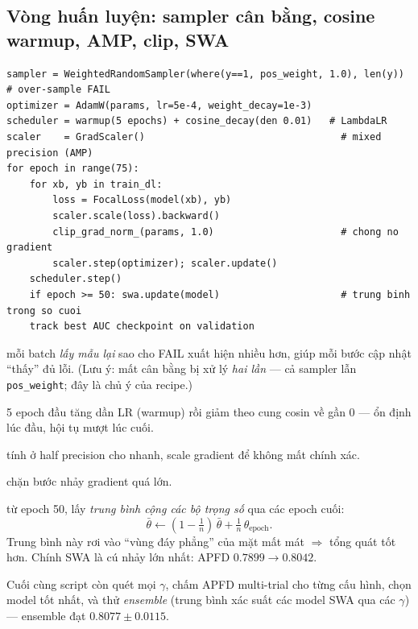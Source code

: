 \documentclass[11pt]{article}
\newcommand{\code}[1]{\textcolor{cInk}{\texttt{#1}}}
\theoremstyle{definition}
\begin{document}
\subsection{Vòng huấn luyện: sampler cân bằng, cosine warmup, AMP, clip, SWA}
\label{sec:trainA}
\begin{lstlisting}
sampler = WeightedRandomSampler(where(y==1, pos_weight, 1.0), len(y))  # over-sample FAIL
optimizer = AdamW(params, lr=5e-4, weight_decay=1e-3)
scheduler = warmup(5 epochs) + cosine_decay(den 0.01)   # LambdaLR
scaler    = GradScaler()                                  # mixed precision (AMP)
for epoch in range(75):
    for xb, yb in train_dl:
        loss = FocalLoss(model(xb), yb)
        scaler.scale(loss).backward()
        clip_grad_norm_(params, 1.0)                      # chong no gradient
        scaler.step(optimizer); scaler.update()
    scheduler.step()
    if epoch >= 50: swa.update(model)                     # trung binh trong so cuoi
    track best AUC checkpoint on validation
\end{lstlisting}
\begin{description}[leftmargin=0em,style=nextline]
\item[WeightedRandomSampler] mỗi batch \emph{lấy mẫu lại} sao cho FAIL xuất hiện
nhiều hơn, giúp mỗi bước cập nhật ``thấy'' đủ lỗi. (Lưu ý: mất cân bằng bị xử lý
\emph{hai lần} --- cả sampler lẫn \code{pos\_weight}; đây là chủ ý của recipe.)
\item[AdamW + cosine warmup] 5 epoch đầu tăng dần LR (warmup) rồi giảm theo cung
cosin về gần 0 --- ổn định lúc đầu, hội tụ mượt lúc cuối.
\item[AMP (GradScaler)] tính ở half precision cho nhanh, scale gradient để không
mất chính xác.
\item[clip\_grad\_norm 1.0] chặn bước nhảy gradient quá lớn.
\item[SWA (Stochastic Weight Averaging)] từ epoch 50, lấy \emph{trung bình cộng
các bộ trọng số} qua các epoch cuối:
\[
\bar\theta \leftarrow (1-\tfrac1n)\,\bar\theta + \tfrac1n\,\theta_{\text{epoch}}.
\]
Trung bình này rơi vào ``vùng đáy phẳng'' của mặt mất mát $\Rightarrow$ tổng quát
tốt hơn. Chính SWA là cú nhảy lớn nhất: APFD $0.7899\!\to\!0.8042$.
\end{description}
Cuối cùng script còn quét mọi $\gamma$, chấm APFD multi-trial cho từng cấu hình,
chọn model tốt nhất, và thử \emph{ensemble} (trung bình xác suất các model SWA
qua các $\gamma$) --- ensemble đạt $0.8077\pm0.0115$.

\end{document}
